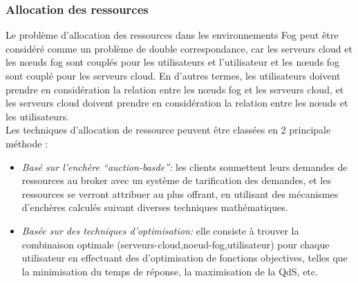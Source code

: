 \subsubsection{Allocation des ressources}
Le problème d'allocation des ressources dans les environnements Fog peut être considéré comme un problème de double correspondance, car les serveurs cloud et les nœuds fog sont couplés pour les utilisateurs et l'utilisateur et les nœuds fog sont couplé pour les serveurs cloud. En d’autres termes, les utilisateurs doivent prendre en considération la relation entre les nœuds fog et les serveurs cloud, et les serveurs cloud doivent prendre en considération la relation entre les nœuds et les utilisateurs.\\ 
Les techniques d’allocation de ressource peuvent être classées en 2 principale méthode :
\begin{itemize}
  \item \emph{Basé sur l’enchère “auction-basde”:} les clients soumettent leurs demandes de ressources au broker avec un système de tarification des demandes, et les ressources se verront attribuer au plus offrant, en utilisant des mécanismes d'enchères calculés suivant diverses techniques mathématiques.
  \item \emph{Basée sur des techniques d’optimisation:} elle consiste à trouver la combinaison optimale (serveurs-cloud,noeud-fog,utilisateur) pour chaque utilisateur en effectuant des d’optimisation de fonctions objectives, telles que la minimisation du temps de réponse, la maximisation de la QdS, etc.
\end{itemize}
